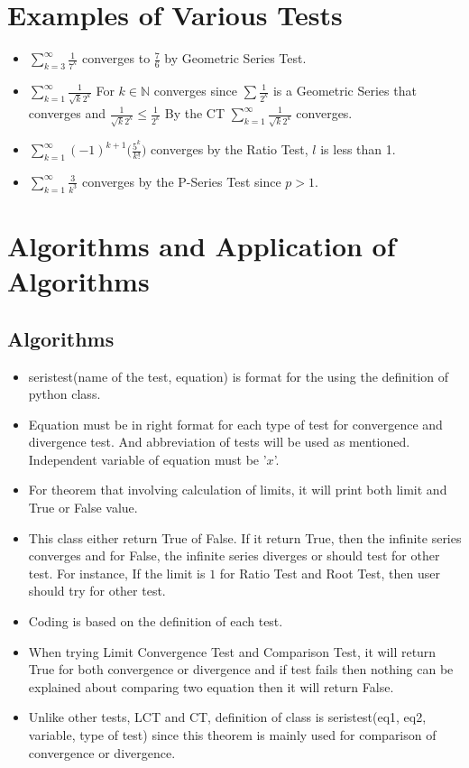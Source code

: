 \documentclass[12pt]{article}
\begin{document}
\section{Examples of Various Tests}
\begin{itemize}
\item $\displaystyle\sum_{k=3}^{\infty}\frac{1}{7^k}$ converges to $\frac{7}{6}$ by Geometric Series Test.
\item $\displaystyle\sum_{k=1}^{\infty}\frac{1}{\sqrt{k}2^k}$ For $k\in \mathbb{N}$ converges since $\sum \frac{1}{2^k}$ is a Geometric Series that converges and $\frac{1}{\sqrt{k}2^k}\le \frac{1}{2^k}$ By the CT $\displaystyle\sum_{k=1}^{\infty}\frac{1}{\sqrt{k}2^k}$ converges.
\item $\displaystyle\sum_{k=1}^{\infty}(-1)^{k+1}\big(\frac{5^k}{k!}\big)$ converges by the Ratio Test, $l$ is less than 1.
\item $\displaystyle\sum_{k=1}^{\infty}\frac{3}{k^3}$ converges by the P-Series Test since $p>1$.
\end{itemize}
\section{Algorithms and Application of Algorithms}
\subsection{Algorithms}
\begin{itemize}
\item seristest(name of the test, equation) is format for the using the definition of python class.
\item Equation must be in right format for each type of test for convergence and divergence test. And abbreviation of tests will be used as mentioned. Independent variable of equation must be '$x$'. 
\item For theorem that involving calculation of limits, it will print both limit and True or False value.
\item This class either return True of False. If it return True, then the infinite series converges and for False, the infinite series diverges or should test for other test. For instance, If the limit is $1$ for Ratio Test and Root Test, then user should try for other test.
\item Coding is based on the definition of each test.
\item When trying Limit Convergence Test and Comparison Test, it will return True for both convergence or divergence and if test fails then nothing can be explained about comparing two equation then it will return False.
\item Unlike other tests, LCT and CT, definition of class is seristest(eq1, eq2, variable, type of test) since this theorem is mainly used for comparison of convergence or divergence.
\end {itemize}
\end{document}
